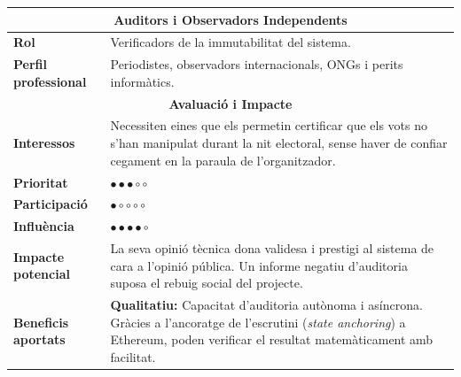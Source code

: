 \begin{table}[H]
\centering
\renewcommand{\arraystretch}{1.5}
\begin{tabularx}{\textwidth}{|l|X|}
\hline
\multicolumn{2}{|c|}{\textbf{Auditors i Observadors Independents}} \\ \hline
\textbf{Rol} & Verificadors de la immutabilitat del sistema. \\ \hline
\textbf{Perfil professional} & Periodistes, observadors internacionals, ONGs i perits informàtics. \\ \hline
\multicolumn{2}{|c|}{\textbf{Avaluació i Impacte}} \\ \hline
\textbf{Interessos} & Necessiten eines que els permetin certificar que els vots no s'han manipulat durant la nit electoral, sense haver de confiar cegament en la paraula de l'organitzador. \\ \hline
\textbf{Prioritat} & \(\bullet \bullet \bullet \circ \circ\) \\ \hline
\textbf{Participació} & \(\bullet \circ \circ \circ \circ\) \\ \hline
\textbf{Influència} & \(\bullet \bullet \bullet \bullet \circ\) \\ \hline
\textbf{Impacte potencial} & La seva opinió tècnica dona validesa i prestigi al sistema de cara a l'opinió pública. Un informe negatiu d'auditoria suposa el rebuig social del projecte. \\ \hline
\textbf{Beneficis aportats} & \textbf{Qualitatiu:} Capacitat d'auditoria autònoma i asíncrona. Gràcies a l'ancoratge de l'escrutini (\textit{state anchoring}) a Ethereum, poden verificar el resultat matemàticament amb facilitat. \\ \hline
\end{tabularx}
\end{table}

\vspace{0.5cm}

